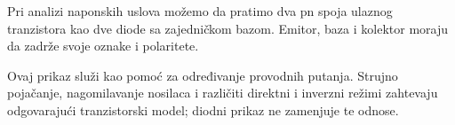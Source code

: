 Pri analizi naponskih uslova možemo da pratimo dva pn spoja ulaznog tranzistora kao dve diode sa zajedničkom bazom. Emitor, baza i kolektor moraju da zadrže svoje oznake i polaritete.

Ovaj prikaz služi kao pomoć za određivanje provodnih putanja. Strujno pojačanje, nagomilavanje nosilaca i različiti direktni i inverzni režimi zahtevaju odgovarajući tranzistorski model; diodni prikaz ne zamenjuje te odnose.
